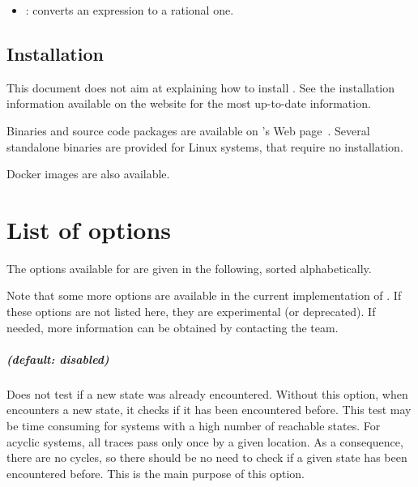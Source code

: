 \begin{itemize}
	\item {}: converts an  expression to a rational one.
\end{itemize}



\section{Installation}

This document does not aim at explaining how to install \imitator{}.
See the installation information available on the website for the most up-to-date information.

Binaries and source code packages are available on \imitator{}'s Web page~\cite{imitator}.
Several standalone binaries are provided for Linux systems, that require no installation.

Docker images are also available.






\chapter{List of options}\label{chapter:options}

The options available for \imitator{} are given in the following, sorted alphabetically.

Note that some more options are available in the current implementation of \imitator{}.
If these options are not listed here, they are experimental (or deprecated).
If needed, more information can be obtained by contacting the \imitator{} team.



\paragraph{ (default: disabled)}
Does not test if a new state was already encountered.
Without this option, when \imitator{} encounters a new state, it checks if it has been encountered before.
This test may be time consuming for systems with a high number of reachable states.
For acyclic systems, all traces pass only once by a given location.
As a consequence, there are no cycles, so there should be no need to check if a given state has been encountered before.
This is the main purpose of this option.

